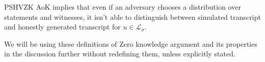 PSHVZK AoK implies that even if an adversary chooses a
distribution over statements and witnesses, it isn't able to
distinguish between simulated transcript and honestly generated
transcript for $u \in \mathcal{L}_{\sigma}$.

We will be using these definitions of Zero knowledge argument and its properties in the discussion further without redefining them, unless explicitly stated.



